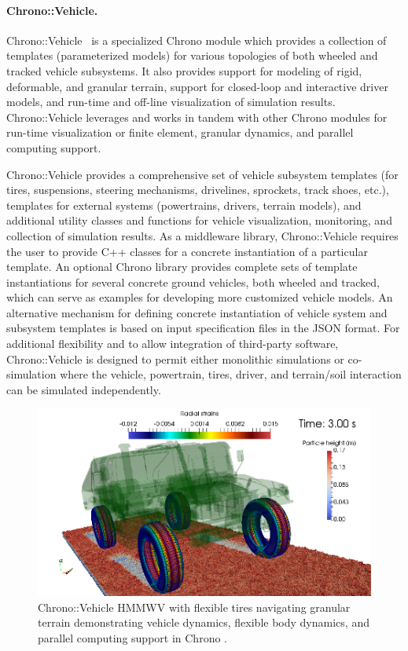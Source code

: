 \documentclass[12pt,twocolumn]{article}
\begin{document}
\paragraph{Chrono::Vehicle.} Chrono::Vehicle~\cite{ChronoVehicle2019} is a specialized Chrono module which provides a collection of templates (parameterized models) for various topologies of both wheeled and tracked vehicle subsystems. It also provides support for modeling of rigid, deformable, and granular terrain, support for closed-loop and interactive driver models, and run-time and off-line visualization of simulation results. Chrono::Vehicle leverages and works in tandem with other Chrono modules for run-time visualization or finite element, granular dynamics, and parallel computing support.

Chrono::Vehicle provides a comprehensive set of vehicle subsystem templates (for tires, suspensions, steering mechanisms, drivelines, sprockets, track shoes, etc.), templates for external systems (powertrains, drivers, terrain models), and additional utility classes and functions for vehicle visualization, monitoring, and collection of simulation results.  As a middleware library, Chrono::Vehicle requires the user to provide C++ classes for a concrete instantiation of a particular template.  An optional Chrono library provides complete sets of template instantiations for several concrete ground vehicles, both wheeled and tracked, which can serve as examples for developing more customized vehicle models. An alternative mechanism for defining concrete instantiation of vehicle system and subsystem templates is based on input specification files in the JSON format.  For additional flexibility and to allow integration of third-party software, Chrono::Vehicle is designed to permit either monolithic simulations or co-simulation where the vehicle, powertrain, tires, driver, and terrain/soil interaction can be simulated independently.

\begin{figure}
    \centering
    \includegraphics[width=0.8\columnwidth]{Figs/HMMWV-Granular.png}
    \caption{{\small Chrono::Vehicle HMMWV with flexible tires navigating granular terrain demonstrating vehicle dynamics, flexible body dynamics, and parallel computing support in Chrono \cite{antonioVehicleTireGranMatSim2017}.}}   
    \label{fig:hmmwvgranular}
\end{figure}
\end{document}
